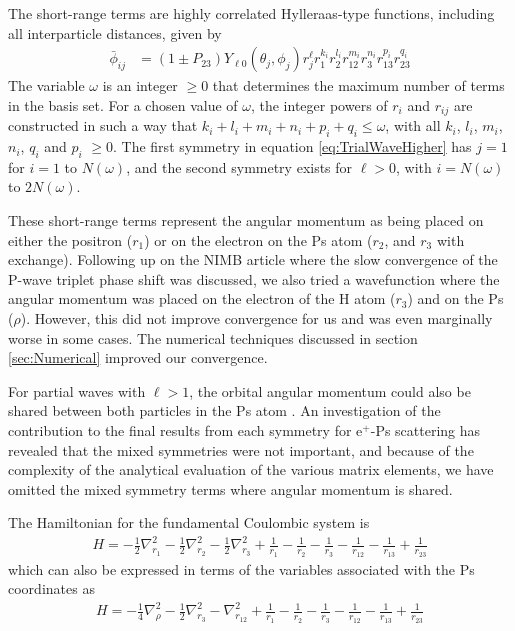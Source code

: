 \documentclass[preprint,showpacs,preprintnumbers,amsmath,amssymb]{revtex4}
\begin{document}
The short-range terms are highly correlated Hylleraas-type functions, including all interparticle distances, given by
\begin{subequations}
\label{eq:PhiDef}
\begin{align}
\bar{\phi}_{ij} &= \left(1 \pm P_{23}\right) Y_{\ell 0}(\theta_j,\phi_j) r_j^{\ell} r_1^{k_i} r_2^{l_i} r_{12}^{m_i} r_3^{n_i} r_{13}^{p_i} r_{23}^{q_i} \label{eq:PartialWavePhi}
\end{align}
\end{subequations}
The variable $\omega$ is an integer $\geq 0$ that determines the maximum number of terms in the basis set.  For a chosen value of $\omega$, the integer powers of $r_i$ and $r_{ij}$ are constructed in such a way that $k_i + l_i + m_i + n_i + p_i + q_i \leq \omega$, with all $k_i$, $l_i$, $m_i$, $n_i$, $q_i$ and $p_i$ $\geq 0$. The first symmetry in equation \ref{eq:TrialWaveHigher} has $j = 1$ for $i=1$ to $N(\omega)$, and the second symmetry exists for $\ell > 0$, with $i = N(\omega)$ to $2N(\omega)$.

These short-range terms represent the angular momentum as being placed on either the positron ($r_1$) or on the electron on the Ps atom ($r_2$, and $r_3$ with exchange).
Following up on the NIMB article \cite{VanReeth2004} where the slow convergence of the P-wave triplet phase shift was discussed, we also tried a wavefunction where the angular momentum was placed on the electron of the H atom ($r_3$) and on the Ps ($\rho$). However, this did not improve convergence for us and was even marginally worse in some cases. The numerical techniques discussed in section \ref{sec:Numerical} improved our convergence.

For partial waves with $\ell>1$, the orbital angular momentum could also be shared between both particles in the Ps atom \cite{Schwartz1961a}. An investigation of the contribution to the final results from each symmetry for e$^+$-Ps scattering \cite{VanReeth1997} has revealed that the mixed symmetries were not important, and because of the complexity of the analytical evaluation of the various matrix elements, we have omitted the mixed symmetry terms where angular momentum is shared.

The Hamiltonian for the fundamental Coulombic system is
\begin{align}
H = -\frac{1}{2} \nabla_{r_1}^2 - \frac{1}{2} \nabla_{r_2}^2 - \frac{1}{2} \nabla_{r_3}^2 + \frac {1}{r_1}-\frac {1}{r_2}-\frac {1}{r_3}-\frac {1}{r_{12}}-\frac {1}{r_{13}}+\frac {1}{r_{23}}
	\label{Hamiltonian1}
\end{align}
which can also be expressed in terms of the variables associated with the Ps coordinates as
\begin{align}
H = -\frac{1}{4} \nabla_{\rho}^2 - \frac{1}{2} \nabla_{r_3}^2 - \nabla_{r_{12}}^2 + \frac {1}{r_1}-\frac {1}{r_2}-\frac {1}{r_3}-\frac {1}{r_{12}}-\frac {1}{r_{13}}+\frac {1}{r_{23}}
	\label{Hamiltonian2}
\end{align}
\end{document}
